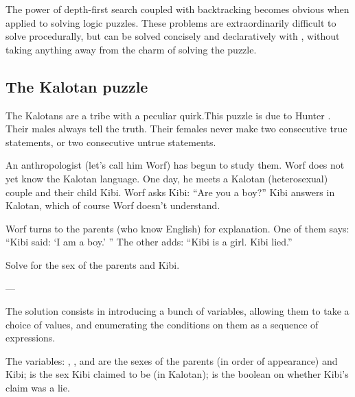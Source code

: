 The power of depth-first search coupled
with backtracking becomes obvious when applied to solving
logic puzzles.  These problems are extraordinarily difficult
to solve procedurally, but can be solved concisely and
declaratively with , without taking anything away
from the charm of solving the puzzle.

\subsection{The Kalotan puzzle}

The Kalotans are a tribe with a peculiar quirk.\f{This
puzzle is due to Hunter \cite{hunter}.}  Their males always
tell the truth.  Their females never make two consecutive
true statements, or two consecutive untrue statements.

An anthropologist (let's call him Worf) has begun to
study them.  Worf does not yet know the Kalotan
language.  One day, he meets a Kalotan (heterosexual)
couple and their child Kibi.  Worf asks Kibi: ``Are you
a boy?''  Kibi answers in Kalotan, which of course Worf
doesn't understand.

Worf turns to the parents (who know English) for
explanation.  One of them says: ``Kibi said: `I am a
boy.' '' The other adds: ``Kibi is a girl.  Kibi lied.''

Solve for the sex of the parents and Kibi.

\centerline{---}

The solution consists in introducing a bunch of variables,
allowing them to take a choice of values, and
enumerating the conditions on them as a sequence of
 expressions.

The variables: ,
, and  are the sexes of the parents (in
order of appearance) and Kibi;  is
the sex Kibi claimed to be (in Kalotan); 
is the boolean on whether Kibi's claim was a lie.


